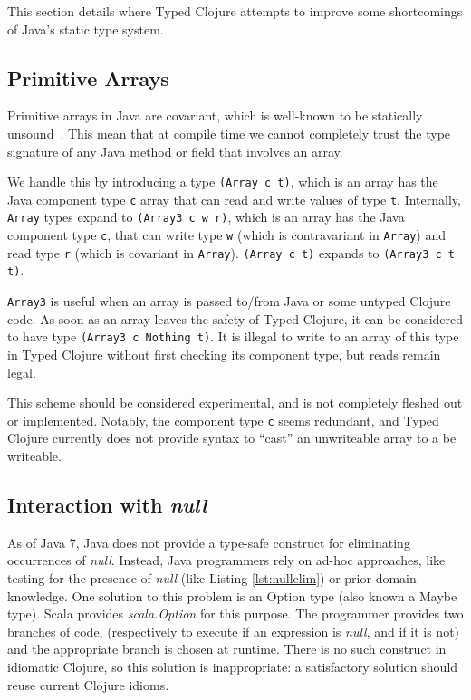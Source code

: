 This section details where Typed Clojure attempts to improve some shortcomings of Java's static type system.

\subsection{Primitive Arrays}
\label{designarrays}

Primitive arrays in Java are covariant, which is well-known to be statically unsound~\cite{OW97,BK99}.
This mean that at compile time we cannot completely trust the type signature of any Java method or field that involves 
an array.

We handle this by introducing a type \lstinline|(Array c t)|, which is an array has the Java component type \lstinline|c| 
array that can read and write values of type \lstinline|t|.
Internally, \lstinline|Array| types expand to \lstinline|(Array3 c w r)|,
which is an array has the Java component type \lstinline|c|,
that can write type \lstinline|w| (which is contravariant in \lstinline|Array|) and read type \lstinline|r| 
(which is covariant in \lstinline|Array|).
\lstinline|(Array c t)| expands to \lstinline|(Array3 c t t)|.

\lstinline|Array3| is useful when an array is passed to/from Java or some untyped Clojure code.
As soon as an array leaves the safety of Typed Clojure, it can be considered to have type
\lstinline|(Array3 c Nothing t)|. It is illegal to write to an array of this type in Typed Clojure
without first checking its component type, but reads remain legal.

This scheme should be considered experimental, and is not completely fleshed out or implemented.
Notably, the component type \lstinline|c| seems redundant, and Typed Clojure currently
does not provide syntax to ``cast'' an unwriteable array to a be writeable.

\subsection{Interaction with \emph{null}}
\label{sec:interactionnull}

As of Java 7, Java does not provide a type-safe construct for eliminating
occurrences of \emph{null}. Instead, Java programmers rely on ad-hoc approaches,
like testing for the presence of \emph{null} (like Listing \ref{lst:nullelim}) or prior domain knowledge.
One solution to this problem is an Option type (also known a Maybe type).
Scala provides \emph{scala.Option} for this purpose. The programmer provides two branches of code,
(respectively to execute if an expression is \emph{null}, and if it is not)
and the appropriate branch is chosen at runtime.
There is no such construct in idiomatic Clojure, so this solution is inappropriate:
a satisfactory solution should reuse current Clojure idioms.

